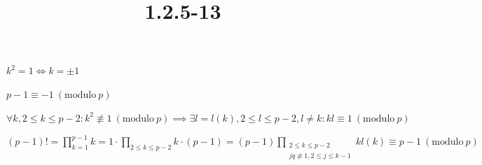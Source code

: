 \documentclass{article}
\title{1.2.5-13}
\begin{document}
\maketitle

$k^2 = 1 \iff k = \pm 1$

$p - 1 \equiv -1\ (\mathrm{modulo}\ p)$

$\forall k, 2 \leq k \leq p - 2: k^2 \not\equiv 1\ (\mathrm{modulo}\ p) \implies \exists l = l(k), 2 \leq l \leq p - 2, l \neq k: kl \equiv 1\ (\mathrm{modulo}\ p)$

$(p-1)! = \prod_{k=1}^{p-1} k = 1 \cdot \prod_{2 \leq k \leq p - 2} k \cdot (p -1) = (p-1) \prod_{\substack{2 \leq k \leq p - 2\\jq \not\equiv 1, 2 \leq j \leq k - 1}}kl(k) \equiv p - 1 \ (\mathrm{modulo}\ p)$
\end{document}
